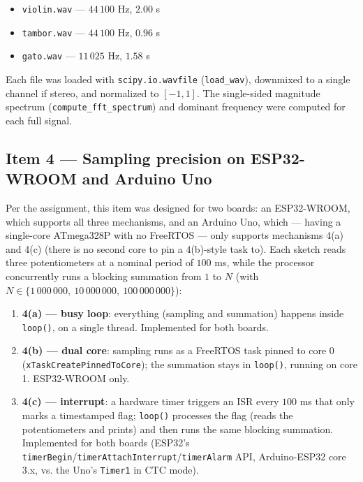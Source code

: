 \begin{itemize}
\item \texttt{violin.wav} — $44\,100$ Hz, $2.00$ s
\item \texttt{tambor.wav} — $44\,100$ Hz, $0.96$ s
\item \texttt{gato.wav} — $11\,025$ Hz, $1.58$ s
\end{itemize}

Each file was loaded with \texttt{scipy.io.wavfile} (\texttt{load\_wav}), downmixed to a single channel if stereo, and normalized to $[-1,1]$. The single-sided magnitude spectrum (\texttt{compute\_fft\_spectrum}) and dominant frequency were computed for each full signal.

\subsection{Item 4 — Sampling precision on ESP32-WROOM and Arduino Uno}
\label{sec:metodologia-embebidos}

Per the assignment, this item was designed for two boards: an ESP32-WROOM, which supports all three mechanisms, and an Arduino Uno, which — having a single-core ATmega328P with no FreeRTOS — only supports mechanisms 4(a) and 4(c) (there is no second core to pin a 4(b)-style task to). Each sketch reads three potentiometers at a nominal period of $100$ ms, while the processor concurrently runs a blocking summation from $1$ to $N$ (with $N \in \{1\,000\,000,\ 10\,000\,000,\ 100\,000\,000\}$):

\begin{enumerate}
\item \textbf{4(a) — busy loop}: everything (sampling and summation) happens inside \texttt{loop()}, on a single thread. Implemented for both boards.
\item \textbf{4(b) — dual core}: sampling runs as a FreeRTOS task pinned to core 0 (\texttt{xTaskCreatePinnedToCore}); the summation stays in \texttt{loop()}, running on core 1. ESP32-WROOM only.
\item \textbf{4(c) — interrupt}: a hardware timer triggers an ISR every $100$ ms that only marks a timestamped flag; \texttt{loop()} processes the flag (reads the potentiometers and prints) and then runs the same blocking summation. Implemented for both boards (ESP32's \texttt{timerBegin}/\texttt{timerAttachInterrupt}/\texttt{timerAlarm} API, Arduino-ESP32 core 3.x, vs. the Uno's \texttt{Timer1} in CTC mode).
\end{enumerate}

